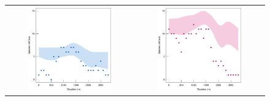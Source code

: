 \documentclass{article}
\begin{document}
\begin{figure}
\hspace{-2cm}
\begin{tabular}{cc}
\includegraphics[width=0.7\textwidth]{figures/zoizos-Snatc}
&
\includegraphics[width=0.7\textwidth]{figures/zoizos-Sexoc}\\


\end{tabular}
\end{figure}
\end{document}

